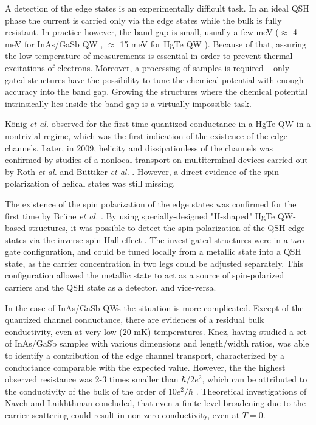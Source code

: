\documentclass[titlepage,a4paper]{book}
\begin{document}
A detection of the edge states is an experimentally difficult task. In an ideal QSH phase the current is carried only via the edge states while the bulk is fully resistant. In practice however, the band gap is small, usually a few meV ($\approx$ 4 meV for InAs/GaSb QW \cite{Altarelli_BandStructure}\cite{Yang_BandStructure}, $\approx$ 15 meV for HgTe QW \cite{Konig_Topology}). Because of that, assuring the low temperature of measurements is essential in order to prevent thermal excitations of electrons. Moreover, a processing of samples is required -- only gated structures have the possibility to tune the chemical potential with enough accuracy into the band gap. Growing the structures where the chemical potential intrinsically lies inside the band gap is a virtually impossible task.

König \textit{et al.} \cite{Konig_Topology} observed for the first time quantized conductance in a HgTe QW in a nontrivial regime, which was the first indication of the existence of the edge channels. Later, in 2009, helicity and dissipationless of the channels was confirmed by studies of a nonlocal transport on multiterminal devices carried out by Roth \textit{et al.} \cite{Roth_State} and Büttiker \textit{et al.} \cite{Buttiker_State}. However, a direct evidence of the spin polarization of helical states was still missing. 

The existence of the spin polarization of the edge states was confirmed for the first time by Brüne \textit{et al.} \cite{Brune_State}. By using specially-designed "H-shaped" HgTe QW-based structures, it was possible to detect the spin polarization of the QSH edge states via the inverse spin Hall effect \cite{Hankiewicz_State}\cite{Valenzuela_State}. The investigated structures were in a two-gate configuration, and could be tuned locally from a metallic state into a QSH state, as the carrier concentration in two legs could be adjusted separately. This configuration allowed the metallic state to act as a source of spin-polarized carriers and the QSH state as a detector, and vice-versa. 

In the case of InAs/GaSb QWs the situation is more complicated. Except of the quantized channel conductance, there are evidences of a residual bulk conductivity, even at very low (20 mK) temperatures. Knez, having studied a set of InAs/GaSb samples with various dimensions and length/width ratios, was able to identify a contribution of the edge channel transport, characterized by a conductance comparable with the expected value. However, the the highest observed resistance was 2-3 times smaller than $\hbar/2e^2$, which can be attributed to the conductivity of the bulk of the order of $10 e^2/ \hbar$ \cite{Knez1_State}. Theoretical investigations of Naveh and Laikhthman \cite{Naveh_State} concluded, that even a finite-level broadening due to the carrier scattering could result in non-zero conductivity, even at $T = 0$.  
\end{document}
